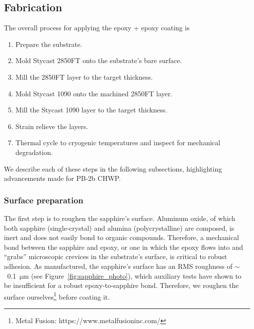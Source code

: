 
\subsection{Fabrication}
\label{sec:sapphire_ar_coating_epoxy_fabrication}

The overall process for applying the epoxy + epoxy coating is
\begin{enumerate}
    \item Prepare the substrate.
    \item Mold Stycast 2850FT onto the substrate's bare surface.
    \item Mill the 2850FT layer to the target thickness.
    \item Mold Stycast 1090 onto the machined 2850FT layer.
    \item Mill the Stycast 1090 layer to the target thickness.
    \item Strain relieve the layers.
    \item Thermal cycle to cryogenic temperatures and inspect for mechanical degradation.
\end{enumerate}
We describe each of these steps in the following subsections, highlighting advancements made for PB-2b CHWP.


\subsubsection{Surface preparation}
\label{sec:sapphire_ar_coating_epoxy_fabrication_surface_preparation}

The first step is to roughen the sapphire's surface. Aluminum oxide, of which both sapphire (single-crystal) and alumina (polycrystalline) are composed, is inert and does not easily bond to organic compounds. Therefore, a mechanical bond between the sapphire and epoxy, or one in which the epoxy flows into and ``grabs'' microscopic crevices in the substrate's surface, is critical to robust adhesion. As manufactured, the sapphire's surface has an RMS roughness of $\sim$~0.1~$\mathrm{\mu m}$ (see Figure~\ref{fig:sapphire_photo}), which auxiliary tests have shown to be insufficient for a robust epoxy-to-sapphire bond. Therefore, we roughen the surface ourselves\footnote{Metal Fusion: https://www.metalfusioninc.com/} before coating it.

